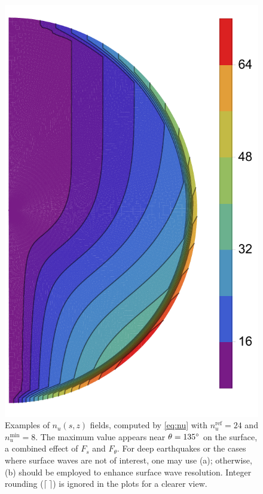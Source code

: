 \documentclass[extra]{gji}
\begin{document}
\begin{figure}
\begin{minipage}{0.22\textwidth}
    \includegraphics[width=\textwidth]{fig/nu24/ys.pdf}
  \end{minipage}
  \caption{Examples of $n_u\left(s,z\right)$ fields, computed by 
  \eqref{eq:nu} with $n_u^\text{ref}=24$ and $n_u^\text{min}=8$. 
  The maximum value appears near $\theta=135\hbox{$^\circ$}$ on the surface,
  a combined effect of $F_s$ and $F_\theta$. For deep earthquakes or 
  the cases where surface waves are not of interest, one may use (a); 
  otherwise, (b) should be employed to enhance surface wave resolution.
  Integer rounding ($\lceil\ \rceil$) is ignored in 
  the plots for a clearer view.} 
  \label{fig:nu}
\end{figure}
\end{document}
